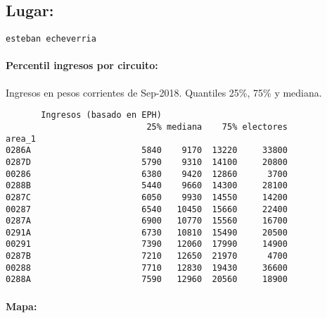 \documentclass[11pt]{article}
\begin{document}
    
    \hypertarget{lugar}{%
\subsection{Lugar:}\label{lugar}}

    
    \begin{Verbatim}[commandchars=\\\{\}]
esteban echeverria

    \end{Verbatim}

    \hypertarget{percentil-ingresos-por-circuito}{%
\paragraph{Percentil ingresos por
circuito:}\label{percentil-ingresos-por-circuito}}

    
    Ingresos en pesos corrientes de Sep-2018. Quantiles 25\%, 75\% y
mediana.

    
    
    \begin{verbatim}
       Ingresos (basado en EPH)                         
                            25% mediana    75% electores
area_1                                                  
0286A                      5840    9170  13220     33800
0287D                      5790    9310  14100     20800
00286                      6380    9420  12860      3700
0288B                      5440    9660  14300     28100
0287C                      6050    9930  14550     14200
00287                      6540   10450  15660     22400
0287A                      6900   10770  15560     16700
0291A                      6730   10810  15490     20500
00291                      7390   12060  17990     14900
0287B                      7210   12650  21970      4700
00288                      7710   12830  19430     36600
0288A                      7590   12960  20560     18900
    \end{verbatim}

    
    \hypertarget{mapa}{%
\paragraph{Mapa:}\label{mapa}}

    
    \begin{center}
    \end{center}
    { \hspace*{\fill} \\}
    
\end{document}
